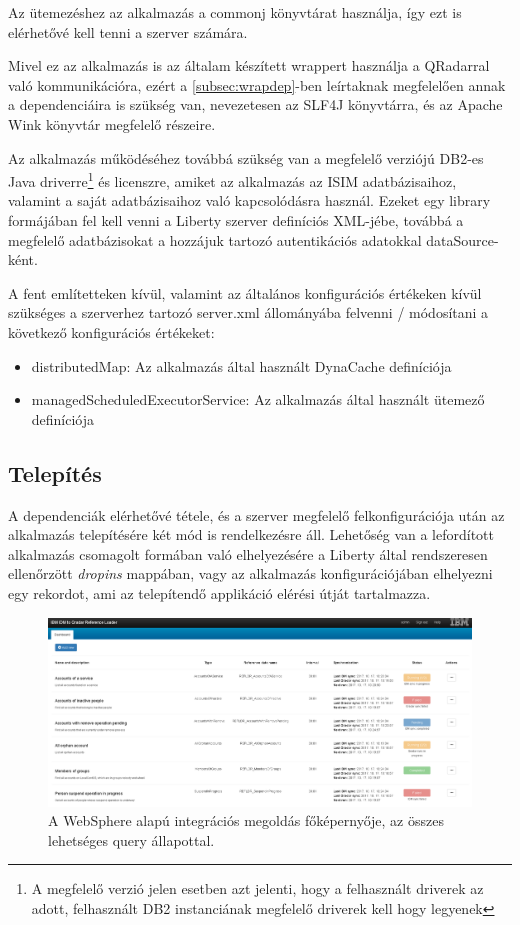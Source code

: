 Az ütemezéshez az alkalmazás a commonj \cite{commonj} könyvtárat használja, így ezt is elérhetővé kell tenni a szerver számára. 

Mivel ez az alkalmazás is az általam készített wrappert használja a QRadarral való kommunikációra, ezért a \ref{subsec:wrapdep}-ben leírtaknak megfelelően annak a dependenciáira is szükség van, nevezetesen az SLF4J könyvtárra, és az Apache Wink könyvtár megfelelő részeire.

Az alkalmazás működéséhez továbbá szükség van a megfelelő verziójú DB2-es Java driverre\footnote{A megfelelő verzió jelen esetben azt jelenti, hogy a felhasznált driverek az adott, felhasznált DB2 instanciának megfelelő driverek kell hogy legyenek} és licenszre, amiket az alkalmazás az ISIM adatbázisaihoz, valamint a saját adatbázisaihoz való kapcsolódásra használ. Ezeket egy library formájában fel kell venni a Liberty szerver definíciós XML-jébe, továbbá a megfelelő adatbázisokat a hozzájuk tartozó autentikációs adatokkal dataSource-ként.\cite{wsdatasource}

A fent említetteken kívül, valamint az általános konfigurációs értékeken kívül szükséges a szerverhez tartozó server.xml állományába felvenni / módosítani a következő konfigurációs értékeket:
\begin{itemize}
	\item distributedMap\cite{dynacache}: Az alkalmazás által használt DynaCache definíciója 
	\item managedScheduledExecutorService\cite{wsscheduler}: Az alkalmazás által használt ütemező definíciója
\end{itemize}

\subsection{Telepítés}
A dependenciák elérhetővé tétele, és a szerver megfelelő felkonfigurációja után az alkalmazás telepítésére két mód is rendelkezésre áll. Lehetőség van a lefordított alkalmazás csomagolt formában való elhelyezésére a Liberty által rendszeresen ellenőrzött \textit{dropins} mappában, vagy az alkalmazás konfigurációjában elhelyezni egy rekordot, ami az telepítendő applikáció elérési útját tartalmazza. \cite{wsdropin}

\begin{figure}[!h]
	\centering
	\includegraphics[width=0.8\linewidth]{figures/refloader_ui/all_states}
	\caption{A WebSphere alapú integrációs megoldás főképernyője, az összes lehetséges query állapottal.}
	\label{fig:allstates}
\end{figure}

